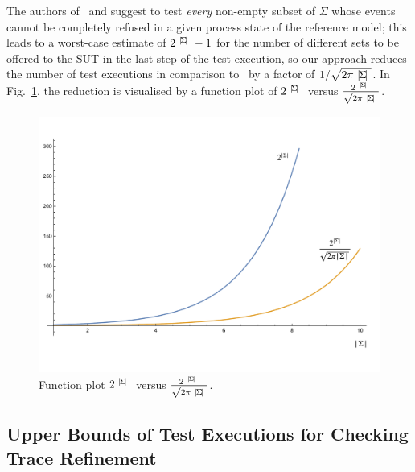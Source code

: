 The authors of~\cite{Hennessy:1988:ATP:50497} and
\cite{DBLP:conf/icfem/CavalcantiG07} suggest to test {\it every} non-empty
subset of $\Sigma$ whose events cannot be completely refused in a given
process state of the reference model; this leads to a worst-case estimate of
$2^{{~|\! \Sigma\!|~}}-1$ for the number of different sets to be offered to the
SUT in the last step of the test execution, so our approach reduces the
number of test executions in comparison
to~\cite{Hennessy:1988:ATP:50497,DBLP:conf/icfem/CavalcantiG07} by a factor
of $1/{\sqrt{2\pi {~|\! \Sigma\!|~}}}$. In Fig.~\ref{fig:minhita}, the reduction
is visualised by a function plot of $2^{{~|\! \Sigma\!|~}}$ versus
$\frac{2^{~|\! \Sigma\!|~}}{\sqrt{2\pi {~|\! \Sigma\!|~}}}$. 
 \begin{figure}
 \begin{center}
\includegraphics[width=.8\textwidth]{minhit-fig.pdf}
\end{center}
\vspace*{-10mm}
\caption{Function plot $2^{{~|\! \Sigma\!|~}}$ versus $\frac{2^{~|\! \Sigma\!|~}}{\sqrt{2\pi {~|\! \Sigma\!|~}}}$.}
 \label{fig:minhita}
 \end{figure}

\subsection{Upper Bounds of Test Executions for Checking Trace Refinement}

